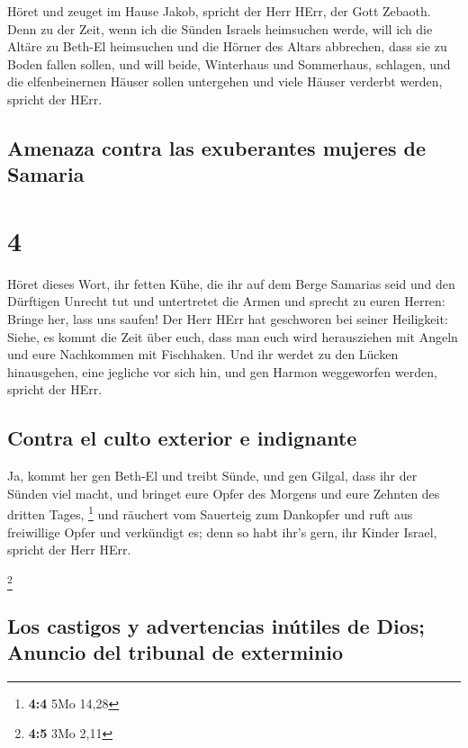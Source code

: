  Höret und zeuget im Hause Jakob, spricht der Herr HErr,
der Gott Zebaoth.  Denn zu der Zeit, wenn ich die Sünden
Israels heimsuchen werde, will ich die Altäre zu Beth-El heimsuchen und
die Hörner des Altars abbrechen, dass sie zu Boden fallen sollen,
 und will beide, Winterhaus und Sommerhaus, schlagen, und
die elfenbeinernen Häuser sollen untergehen und viele Häuser verderbt
werden, spricht der HErr.

\hypertarget{amenaza-contra-las-exuberantes-mujeres-de-samaria}{%
\subsection{Amenaza contra las exuberantes mujeres de
Samaria}\label{amenaza-contra-las-exuberantes-mujeres-de-samaria}}

\hypertarget{section-3}{%
\section{4}\label{section-3}}

 Höret dieses Wort, ihr fetten Kühe, die ihr auf dem Berge
Samarias seid und den Dürftigen Unrecht tut und untertretet die Armen
und sprecht zu euren Herren: Bringe her, lass uns saufen! 
Der Herr HErr hat geschworen bei seiner Heiligkeit: Siehe, es kommt die
Zeit über euch, dass man euch wird herausziehen mit Angeln und eure
Nachkommen mit Fischhaken.  Und ihr werdet zu den Lücken
hinausgehen, eine jegliche vor sich hin, und gen Harmon weggeworfen
werden, spricht der HErr.

\hypertarget{contra-el-culto-exterior-e-indignante}{%
\subsection{Contra el culto exterior e
indignante}\label{contra-el-culto-exterior-e-indignante}}

 Ja, kommt her gen Beth-El und treibt Sünde, und gen
Gilgal, dass ihr der Sünden viel macht, und bringet eure Opfer des
Morgens und eure Zehnten des dritten Tages, \footnote{\textbf{4:4} 5Mo
  14,28}  und räuchert vom Sauerteig zum Dankopfer und
ruft aus freiwillige Opfer und verkündigt es; denn so habt ihr's gern,
ihr Kinder Israel, spricht der Herr HErr.

\footnote{\textbf{4:5} 3Mo 2,11}

\hypertarget{los-castigos-y-advertencias-inuxfatiles-de-dios-anuncio-del-tribunal-de-exterminio}{%
\subsection{Los castigos y advertencias inútiles de Dios; Anuncio del
tribunal de
exterminio}\label{los-castigos-y-advertencias-inuxfatiles-de-dios-anuncio-del-tribunal-de-exterminio}}

